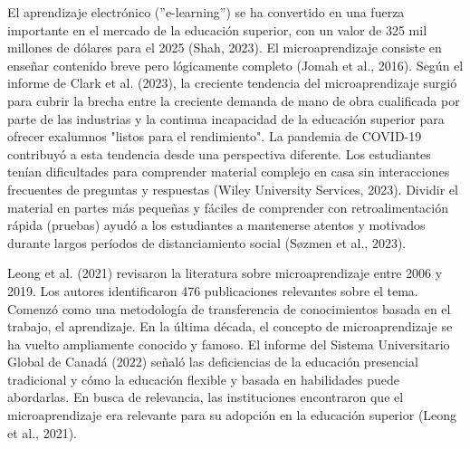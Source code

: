 

El aprendizaje electrónico (''e-learning'') se ha convertido en una fuerza importante en el
mercado de la educación superior, con un valor de 325 mil millones de dólares
para el 2025 (Shah, 2023). El microaprendizaje consiste en enseñar contenido breve
pero lógicamente completo (Jomah et al., 2016). Según el informe de Clark et al.
(2023), la creciente tendencia del microaprendizaje surgió para cubrir la brecha
entre la creciente demanda de mano de obra cualificada por parte de las
industrias y la continua incapacidad de la educación superior para ofrecer
exalumnos "listos para el rendimiento". La pandemia de COVID-19 contribuyó a
esta tendencia desde una perspectiva diferente. Los estudiantes tenían
dificultades para comprender material complejo en casa sin interacciones
frecuentes de preguntas y respuestas (Wiley University Services, 2023). Dividir
el material en partes más pequeñas y fáciles de comprender con retroalimentación
rápida (pruebas) ayudó a los estudiantes a mantenerse atentos y motivados
durante largos períodos de distanciamiento social (Søzmen et al., 2023).

Leong et al. (2021) revisaron la literatura sobre microaprendizaje entre 2006 y
2019. Los autores identificaron 476 publicaciones relevantes sobre el tema.
Comenzó como una metodología de transferencia de conocimientos basada en el
trabajo, el aprendizaje. En la última década, el concepto de microaprendizaje se
ha vuelto ampliamente conocido y famoso. El informe del Sistema Universitario
Global de Canadá (2022) señaló las deficiencias de la educación presencial
tradicional y cómo la educación flexible y basada en habilidades puede
abordarlas. En busca de relevancia, las instituciones encontraron que el
microaprendizaje era relevante para su adopción en la educación superior (Leong
et al., 2021).

